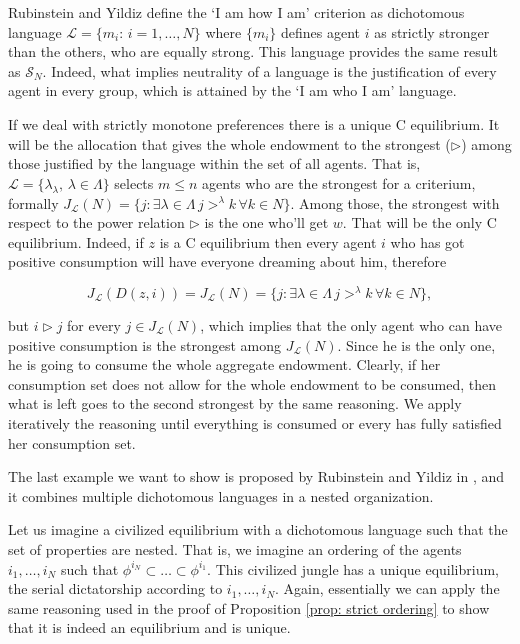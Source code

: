 Rubinstein and Yildiz define the `I am how I am' criterion as dichotomous language $\mathcal{L}=\{m_i:\,i=1,\dots,N\}$ where $\{m_i\}$ defines agent $i$ as strictly stronger than the others, who are equally strong. This language provides the same result as $\mathcal{S}_N$. Indeed, what implies neutrality of a language is the justification of every agent in every group, which is attained by the `I am who I am' language.

\begin{example}
    If we deal with strictly monotone preferences there is a unique C equilibrium. It will be the allocation that gives the whole endowment to the strongest ($\triangleright$) among those justified by the language within the set of all agents. That is, $\mathcal{L}=\{\lambda_{\lambda},\,\lambda\in\Lambda\}$ selects $m\leq n$ agents who are the strongest for a criterium, formally $J_{\mathcal{L}}(N)=\{j:\exists \lambda\in\Lambda\,j>^{\lambda}k\,\forall k\in N\}$. Among those, the strongest with respect to the power relation $\triangleright$ is the one who'll get $w$. That will be the only C equilibrium. Indeed, if $z$ is a C equilibrium then every agent $i$ who has got positive consumption will have everyone dreaming about him, therefore
    
    \[J_{\mathcal{L}}(D(z,i))=J_{\mathcal{L}}(N)=\{j:\exists \lambda\in\Lambda\,j>^{\lambda}k\,\forall k\in N\},\]

    but $i\triangleright j$ for every $j\in J_{\mathcal{L}}(N)$, which implies that the only agent who can have positive consumption is the strongest among $J_{\mathcal{L}}(N)$. Since he is the only one, he is going to consume the whole aggregate endowment. Clearly, if her consumption set does not allow for the whole endowment to be consumed, then what is left goes to the second strongest by the same reasoning. We apply iteratively the reasoning until everything is consumed or every has fully satisfied her consumption set.    
\end{example}

The last example we want to show is proposed by Rubinstein and Yildiz in \cite[RY]{RY}, and it combines multiple dichotomous languages in a nested organization.

\begin{example}
    Let us imagine a civilized equilibrium with a dichotomous language such that the set of properties are nested. That is, we imagine an ordering of the agents $i_1,\dots,i_N$ such that $\phi^{i_N}\subset\dots\subset\phi^{i_1}$. This civilized jungle has a unique equilibrium, the serial dictatorship according to $i_1,\dots,i_N$. Again, essentially we can apply the same reasoning used in the proof of Proposition \ref{prop: strict ordering} to show that it is indeed an equilibrium and is unique. 
\end{example}

